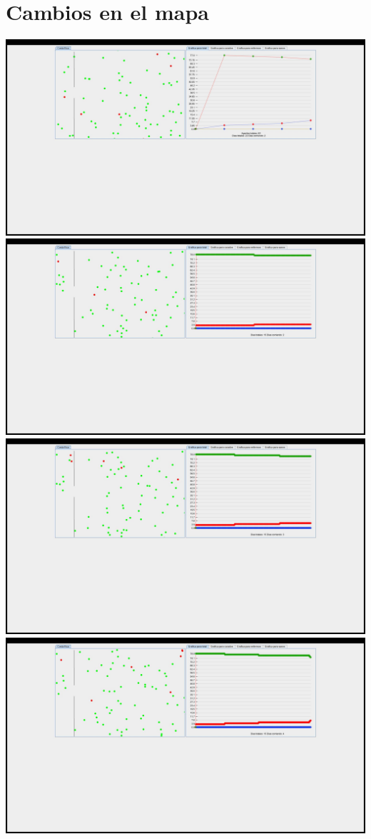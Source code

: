 \documentclass{report}
\begin{document}
\section{Cambios en el mapa}
\includegraphics[scale=0.20]{1}
\includegraphics[scale=0.20]{2}
\includegraphics[scale=0.20]{3}
\includegraphics[scale=0.20]{4}
\end{document}
